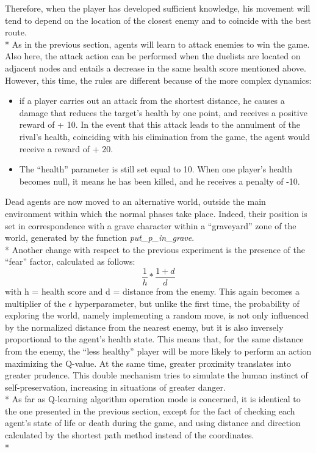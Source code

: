 Therefore, when the player has developed sufficient knowledge, his movement will tend to depend on the location of the closest enemy and to coincide with the best route.\\*
As in the previous section, agents will learn to attack enemies to win the game. Also here, the attack action can be performed when the duelists are located on adjacent nodes and entails a decrease in the same health score mentioned above. However, this time, the rules are different because of the more complex dynamics:
\begin{itemize}[noitemsep, topsep=0ex]
  \item if a player carries out an attack from the shortest distance, he causes a damage that reduces the target's health by one point, and receives a positive reward of + 10. In the event that this attack leads to the annulment of the rival's health, coinciding with his elimination from the game, the agent would receive a reward of + 20.
  \item The ``health'' parameter is still set equal to 10. When one player's health becomes null, it means he has been killed, and he receives a penalty of -10.
\end{itemize}
Dead agents are now moved to an alternative world, outside the main environment within which the normal phases take place. Indeed, their position is set in correspondence with a grave character within a ``graveyard'' zone of the world, generated by the function \textit{put\_p\_in\_grave}.\\*
Another change with respect to the previous experiment is the presence of the ``fear'' factor, calculated as follows:
$$\frac{1}{h}*\frac{1+d}{d}$$
with h = health score and d = distance from the enemy.
This again becomes a multiplier of the $\epsilon$ hyperparameter, but unlike the first time, the probability of exploring the world, namely implementing a random move, is not only influenced by the normalized distance from the nearest enemy, but it is also inversely proportional to the agent's health state. This means that, for the same distance from the enemy, the ``less healthy'' player will be more likely to perform an action maximizing the Q-value. At the same time, greater 	proximity translates into greater prudence. This double mechanism tries to simulate the human instinct of self-preservation, increasing in situations of greater danger.\\*
As far as Q-learning algorithm operation mode is concerned, it is identical to the one presented in the previous section, except for the fact of checking each agent's state of life or death during the game, and using distance and direction calculated by the shortest path method instead of the coordinates.\\*
